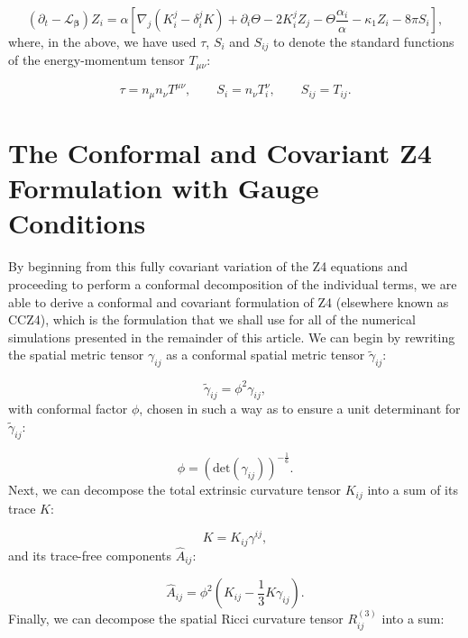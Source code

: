 \documentclass{article}
\begin{document}
\begin{equation}
\left( \partial_t - \mathcal{L}_{\boldsymbol{\beta}} \right) Z_i = \alpha \left[ \nabla_j \left( K_{i}^{j} - \delta_{i}^{j} K \right) + \partial_i \Theta - 2 K_{i}^{j} Z_j - \Theta \frac{\alpha_i}{\alpha} - \kappa_1 Z_i - 8 \pi S_i \right],
\end{equation}
where, in the above, we have used ${\tau}$, ${S_i}$ and ${S_{i j}}$ to denote the standard functions of the energy-momentum tensor ${T_{\mu \nu}}$:

\begin{equation}
\tau = n_{\mu} n_{\nu} T^{\mu \nu}, \qquad S_i = n_{\nu} T_{i}^{\nu}, \qquad S_{i j} = T_{i j}.
\end{equation}

\section{The Conformal and Covariant Z4 Formulation with Gauge Conditions}
\label{sec:Section2}

By beginning from this fully covariant variation of the Z4 equations and proceeding to perform a conformal decomposition of the individual terms\cite{bernuzzi}\cite{hilditch}, we are able to derive a conformal and covariant formulation of Z4 (elsewhere known as CCZ4), which is the formulation that we shall use for all of the numerical simulations presented in the remainder of this article. We can begin by rewriting the spatial metric tensor ${\gamma_{i j}}$ as a conformal spatial metric tensor ${\tilde{\gamma}_{i j}}$:

\begin{equation}
\tilde{\gamma}_{i j} = \phi^2 \gamma_{i j},
\end{equation}
with conformal factor ${\phi}$, chosen in such a way as to ensure a unit determinant for ${\tilde{\gamma}_{i j}}$:

\begin{equation}
\phi = \left( \mathrm{det} \left( \gamma_{i j} \right) \right)^{-\frac{1}{6}}.
\end{equation}
Next, we can decompose the total extrinsic curvature tensor ${K_{i j}}$ into a sum of its trace $K$:

\begin{equation}
K = K_{i j} \gamma^{i j},
\end{equation}
and its trace-free components ${\hat{A}_{i j}}$:

\begin{equation}
\hat{A}_{i j} = \phi^2 \left( K_{i j} - \frac{1}{3} K \gamma_{i j} \right).
\end{equation}
Finally, we can decompose the spatial Ricci curvature tensor ${R_{i j}^{\left( 3 \right)}}$ into a sum:
\end{document}
